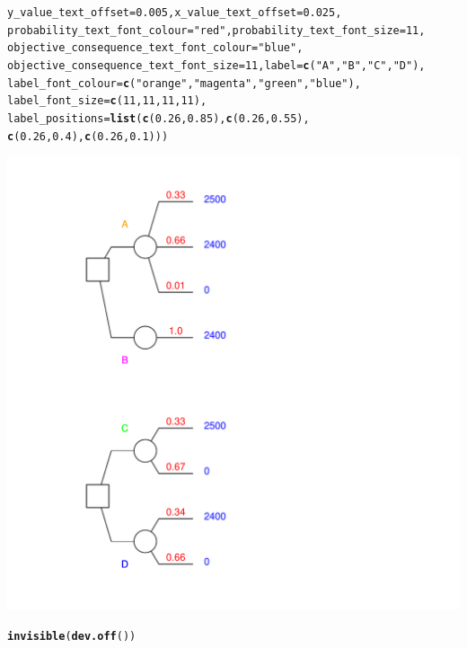 \documentclass{article}\usepackage[]{graphicx}\usepackage[]{color}
\makeatletter
\newcommand{\hlnum}[1]{\textcolor[rgb]{0.686,0.059,0.569}{#1}}%
\newcommand{\hlstr}[1]{\textcolor[rgb]{0.192,0.494,0.8}{#1}}%
\newcommand{\hlstd}[1]{\textcolor[rgb]{0.345,0.345,0.345}{#1}}%
\newcommand{\hlkwc}[1]{\textcolor[rgb]{0.333,0.667,0.333}{#1}}%
\newcommand{\hlkwd}[1]{\textcolor[rgb]{0.737,0.353,0.396}{\textbf{#1}}}%
\newenvironment{kframe}{%
 \def\at@end@of@kframe{}%
 \ifinner\ifhmode%
  \def\at@end@of@kframe{\end{minipage}}%
  \begin{minipage}{\columnwidth}%
 \fi\fi%
 \def\FrameCommand##1{\hskip\@totalleftmargin \hskip-\fboxsep
 \colorbox{shadecolor}{##1}\hskip-\fboxsep
     \hskip-\linewidth \hskip-\@totalleftmargin \hskip\columnwidth}%
 \MakeFramed {\advance\hsize-\width
   \@totalleftmargin\z@ \linewidth\hsize
   \@setminipage}}%
 {\par\unskip\endMakeFramed%
 \at@end@of@kframe}
\newenvironment{knitrout}{}{} %
\makeatother
\begin{document}
\begin{knitrout}
\begin{kframe}
\begin{alltt}
        \hlkwc{y_value_text_offset}\hlstd{=}\hlnum{0.005}\hlstd{,} \hlkwc{x_value_text_offset}\hlstd{=}\hlnum{0.025}\hlstd{,}
        \hlkwc{probability_text_font_colour}\hlstd{=}\hlstr{"red"}\hlstd{,} \hlkwc{probability_text_font_size}\hlstd{=}\hlnum{11}\hlstd{,}
        \hlkwc{objective_consequence_text_font_colour}\hlstd{=}\hlstr{"blue"}\hlstd{,}
        \hlkwc{objective_consequence_text_font_size}\hlstd{=}\hlnum{11}\hlstd{,} \hlkwc{label}\hlstd{=}\hlkwd{c}\hlstd{(}\hlstr{"A"}\hlstd{,}\hlstr{"B"}\hlstd{,}\hlstr{"C"}\hlstd{,} \hlstr{"D"}\hlstd{),}
        \hlkwc{label_font_colour}\hlstd{=}\hlkwd{c}\hlstd{(}\hlstr{"orange"}\hlstd{,}\hlstr{"magenta"}\hlstd{,}\hlstr{"green"}\hlstd{,}\hlstr{"blue"}\hlstd{),}
        \hlkwc{label_font_size}\hlstd{=}\hlkwd{c}\hlstd{(}\hlnum{11}\hlstd{,}\hlnum{11}\hlstd{,}\hlnum{11}\hlstd{,}\hlnum{11}\hlstd{),}
        \hlkwc{label_positions}\hlstd{=}\hlkwd{list}\hlstd{(}\hlkwd{c}\hlstd{(}\hlnum{0.26}\hlstd{,}\hlnum{0.85}\hlstd{),}\hlkwd{c}\hlstd{(}\hlnum{0.26}\hlstd{,}\hlnum{0.55}\hlstd{),}
                \hlkwd{c}\hlstd{(}\hlnum{0.26}\hlstd{,}\hlnum{0.4}\hlstd{),}\hlkwd{c}\hlstd{(}\hlnum{0.26}\hlstd{,}\hlnum{0.1}\hlstd{)))}
\end{alltt}
\end{kframe}

{\centering \includegraphics[width=0.8\linewidth]{figure/unnamed-chunk-2} 

}


\begin{kframe}\begin{alltt}
\hlkwd{invisible}\hlstd{(}\hlkwd{dev.off}\hlstd{())}
\end{alltt}
\end{kframe}
\end{knitrout}
\end{document}
